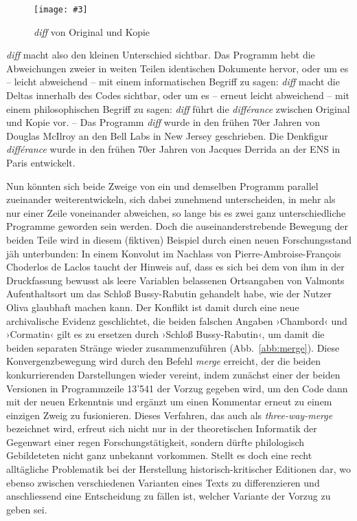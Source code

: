 \documentclass[a4paper,11pt]{article}
\newcommand{\inanf}[1]{›#1‹}
\newcommand{\pngbild}[4]{\texttt{[image: \#3]}}
\begin{document}

\begin{figure}[ht]
\begin{center}
\pngbild{433}{176}{../bilder/OriginalKopie.png}{1.1\textwidth}\\[-3mm]
\caption{\emph{diff} von Original und Kopie}\label{abb:orikopie}
\end{center}
\end{figure}

\emph{diff} macht also den kleinen Unterschied sichtbar. Das Programm hebt die Abweichungen zweier in weiten Teilen identischen Dokumente hervor, oder um es – leicht abweichend – mit einem informatischen Begriff zu sagen: \emph{diff} macht die Deltas innerhalb des Codes sichtbar, oder um es – erneut leicht abweichend – mit einem philosophischen Begriff zu sagen: \emph{diff} führt die \emph{différance} zwischen Original und Kopie vor. – Das Programm \emph{diff} wurde in den frühen 70er Jahren von Douglas McIlroy an den Bell Labs in New Jersey geschrieben. Die Denkfigur \emph{différance} wurde in den frühen 70er Jahren von Jacques Derrida an der ENS in Paris entwickelt. 

Nun könnten sich beide Zweige von ein und demselben Programm parallel zueinander weiterentwickeln, sich dabei zunehmend unterscheiden, in mehr als nur einer Zeile voneinander abweichen, so lange bis es zwei ganz unterschiedliche Programme geworden sein werden. Doch die auseinanderstrebende Bewegung der beiden Teile wird in diesem (fiktiven) Beispiel durch einen neuen Forschungsstand jäh unterbunden: In einem Konvolut im Nachlass von Pierre-Ambroise-François Choderlos de Laclos taucht der Hinweis auf, dass es sich bei dem von ihm in der Druckfassung bewusst als leere Variablen belassenen Ortsangaben von Valmonts Aufenthaltsort um das Schloß Bussy-Rabutin gehandelt habe, wie der Nutzer {\color{olive}Oliva} glaubhaft machen kann. Der Konflikt ist damit durch eine neue archivalische Evidenz geschlichtet, die beiden falschen Angaben \inanf{Chambord} und \inanf{Cormatin} gilt es zu ersetzen durch \inanf{Schloß Bussy-Rabutin}, um damit die beiden separaten Stränge wieder zusammenzuführen (Abb.~\ref{abb:merge}). Diese Konvergenzbewegung wird durch den Befehl \emph{merge} erreicht, der die beiden konkurrierenden Darstellungen wieder vereint, indem zunächst einer der beiden Versionen in Programmzeile 13'541 der Vorzug gegeben wird, um den Code dann mit der neuen Erkenntnis und ergänzt um einen Kommentar erneut zu einem einzigen Zweig zu fusionieren. Dieses Verfahren, das auch als \emph{three-way-merge} bezeichnet wird, erfreut sich nicht nur in der theoretischen Informatik der Gegenwart einer regen Forschungstätigkeit, sondern dürfte philologisch Gebildeteten nicht ganz unbekannt vorkommen. Stellt es doch eine recht alltägliche Problematik bei der Herstellung historisch-kritischer Editionen dar, wo ebenso zwischen verschiedenen Varianten eines Texts zu differenzieren und anschliessend eine Entscheidung zu fällen ist, welcher Variante der Vorzug zu geben sei.
\end{document}

